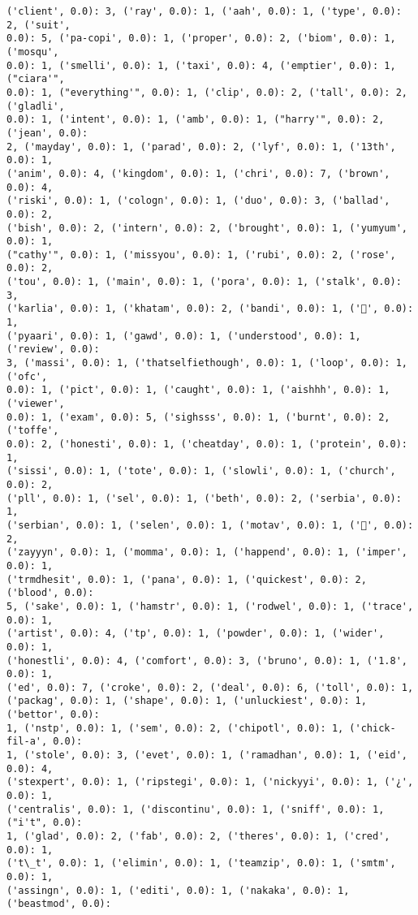 \documentclass[11pt]{article}
\begin{document}
\begin{Verbatim}[commandchars=\\\{\}]
('client', 0.0): 3, ('ray', 0.0): 1, ('aah', 0.0): 1, ('type', 0.0): 2, ('suit',
0.0): 5, ('pa-copi', 0.0): 1, ('proper', 0.0): 2, ('biom', 0.0): 1, ('mosqu',
0.0): 1, ('smelli', 0.0): 1, ('taxi', 0.0): 4, ('emptier', 0.0): 1, ("ciara'",
0.0): 1, ("everything'", 0.0): 1, ('clip', 0.0): 2, ('tall', 0.0): 2, ('gladli',
0.0): 1, ('intent', 0.0): 1, ('amb', 0.0): 1, ("harry'", 0.0): 2, ('jean', 0.0):
2, ('mayday', 0.0): 1, ('parad', 0.0): 2, ('lyf', 0.0): 1, ('13th', 0.0): 1,
('anim', 0.0): 4, ('kingdom', 0.0): 1, ('chri', 0.0): 7, ('brown', 0.0): 4,
('riski', 0.0): 1, ('cologn', 0.0): 1, ('duo', 0.0): 3, ('ballad', 0.0): 2,
('bish', 0.0): 2, ('intern', 0.0): 2, ('brought', 0.0): 1, ('yumyum', 0.0): 1,
("cathy'", 0.0): 1, ('missyou', 0.0): 1, ('rubi', 0.0): 2, ('rose', 0.0): 2,
('tou', 0.0): 1, ('main', 0.0): 1, ('pora', 0.0): 1, ('stalk', 0.0): 3,
('karlia', 0.0): 1, ('khatam', 0.0): 2, ('bandi', 0.0): 1, ('👑', 0.0): 1,
('pyaari', 0.0): 1, ('gawd', 0.0): 1, ('understood', 0.0): 1, ('review', 0.0):
3, ('massi', 0.0): 1, ('thatselfiethough', 0.0): 1, ('loop', 0.0): 1, ('ofc',
0.0): 1, ('pict', 0.0): 1, ('caught', 0.0): 1, ('aishhh', 0.0): 1, ('viewer',
0.0): 1, ('exam', 0.0): 5, ('sighsss', 0.0): 1, ('burnt', 0.0): 2, ('toffe',
0.0): 2, ('honesti', 0.0): 1, ('cheatday', 0.0): 1, ('protein', 0.0): 1,
('sissi', 0.0): 1, ('tote', 0.0): 1, ('slowli', 0.0): 1, ('church', 0.0): 2,
('pll', 0.0): 1, ('sel', 0.0): 1, ('beth', 0.0): 2, ('serbia', 0.0): 1,
('serbian', 0.0): 1, ('selen', 0.0): 1, ('motav', 0.0): 1, ('💋', 0.0): 2,
('zayyyn', 0.0): 1, ('momma', 0.0): 1, ('happend', 0.0): 1, ('imper', 0.0): 1,
('trmdhesit', 0.0): 1, ('pana', 0.0): 1, ('quickest', 0.0): 2, ('blood', 0.0):
5, ('sake', 0.0): 1, ('hamstr', 0.0): 1, ('rodwel', 0.0): 1, ('trace', 0.0): 1,
('artist', 0.0): 4, ('tp', 0.0): 1, ('powder', 0.0): 1, ('wider', 0.0): 1,
('honestli', 0.0): 4, ('comfort', 0.0): 3, ('bruno', 0.0): 1, ('1.8', 0.0): 1,
('ed', 0.0): 7, ('croke', 0.0): 2, ('deal', 0.0): 6, ('toll', 0.0): 1,
('packag', 0.0): 1, ('shape', 0.0): 1, ('unluckiest', 0.0): 1, ('bettor', 0.0):
1, ('nstp', 0.0): 1, ('sem', 0.0): 2, ('chipotl', 0.0): 1, ('chick-fil-a', 0.0):
1, ('stole', 0.0): 3, ('evet', 0.0): 1, ('ramadhan', 0.0): 1, ('eid', 0.0): 4,
('stexpert', 0.0): 1, ('ripstegi', 0.0): 1, ('nickyyi', 0.0): 1, ('¿', 0.0): 1,
('centralis', 0.0): 1, ('discontinu', 0.0): 1, ('sniff', 0.0): 1, ("i't", 0.0):
1, ('glad', 0.0): 2, ('fab', 0.0): 2, ('theres', 0.0): 1, ('cred', 0.0): 1,
('t\_t', 0.0): 1, ('elimin', 0.0): 1, ('teamzip', 0.0): 1, ('smtm', 0.0): 1,
('assingn', 0.0): 1, ('editi', 0.0): 1, ('nakaka', 0.0): 1, ('beastmod', 0.0):

\end{Verbatim}
\end{document}
